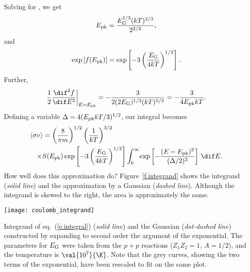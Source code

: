 Solving for \Epk, we get
\[
E_{\mathrm{pk}} = \frac{E_{\mathrm{G}}^{1/3}(kT)^{2/3}}{2^{2/3}},
\]
and 
\[ \exp\left[f(E_{\mathrm{pk}})\right] = \exp\left[-3\left(\frac{E_{\mathrm{G}}}{4kT}\right)^{1/3}\right].
\]
Further,
\[
\left.\frac{1}{2}\frac{\dif^{2}f}{\dif E^{2}}\right|_{E=\Epk} = -\frac{3}{2(2\EG)^{1/3}(kT)^{5/3}} = -\frac{3}{4\Epk kT}.
\]
Defining a variable $\Delta = 4(E_{\mathrm{pk}} kT/3)^{1/2}$, our integral becomes
\begin{eqnarray}\label{e.integral2}
\lefteqn{\langle\sigma v\rangle = \left(\frac{8}{\pi m}\right)^{1/2}\left(\frac{1}{kT}\right)^{3/2}}\nonumber\\
&&\times S(\Epk)
  \exp\left[-3\left(\frac{\EG}{4kT}\right)^{1/3}\right]
  \int_{0}^{\infty}\!\exp\left[-\frac{(E-\Epk)^{2}}{(\Delta/2)^{2}}\right]\,\dif E.
\end{eqnarray}
How well does this approximation do?  Figure~\ref{f.integrand} shows the integrand (\emph{solid line}) and the approximation by a Gaussian (\emph{dashed line}).  Although the integrand is skewed to the right, the area is approximately the same.  
\begin{marginfigure}[-16\baselineskip]
\texttt{[image: coulomb\_integrand]}
\caption[Terms in integrand for calculating Coulomb barrier]{Integrand of eq.~(\protect\ref{e.integral}) (\emph{solid line}) and the Gaussian (\emph{dot-dashed line}) constructed by expanding to second order the argument of the exponential. The parameters for $E_{\mathrm{G}}$ were taken from the $p+p$ reactions ($Z_{1}Z_{2}=1$, $A = 1/2$), and the temperature is $\val{10^{7}}{\K}$.  Note that the grey curves, showing the two terms of the exponential, have been rescaled to fit on the same plot.}
\label{f.integrand}
\end{marginfigure}

